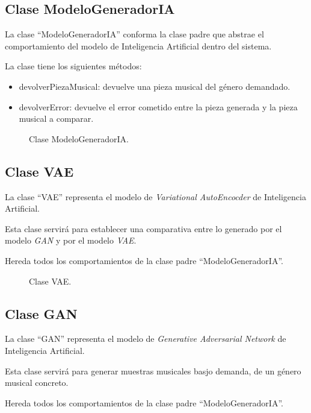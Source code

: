 \subsection{Clase ModeloGeneradorIA}

La clase ``ModeloGeneradorIA'' conforma la clase padre que abstrae el comportamiento del modelo de Inteligencia Artificial dentro del sistema.

La clase tiene los siguientes métodos:

\begin{itemize}
    \item devolverPiezaMusical: devuelve una pieza musical del género demandado.
    \item devolverError: devuelve el error cometido entre la pieza generada y la pieza musical a comparar.
\end{itemize}

\begin{figure}[H]
  \centering
  
  \caption{Clase ModeloGeneradorIA.}
\end{figure}


\subsection{Clase VAE}

La clase ``VAE'' representa el modelo de \emph{Variational AutoEncocder} de Inteligencia Artificial.

Esta clase servirá para establecer una comparativa entre lo generado por el modelo \emph{GAN} y por el modelo \emph{VAE}.

Hereda todos los comportamientos de la clase padre ``ModeloGeneradorIA''.

\begin{figure}[H]
  \centering
  
  \caption{Clase VAE.}
\end{figure}

\subsection{Clase GAN}

La clase ``GAN'' representa el modelo de \emph{Generative Adversarial Network} de Inteligencia Artificial.

Esta clase servirá para generar muestras musicales basjo demanda, de un género musical concreto.

Hereda todos los comportamientos de la clase padre ``ModeloGeneradorIA''.

